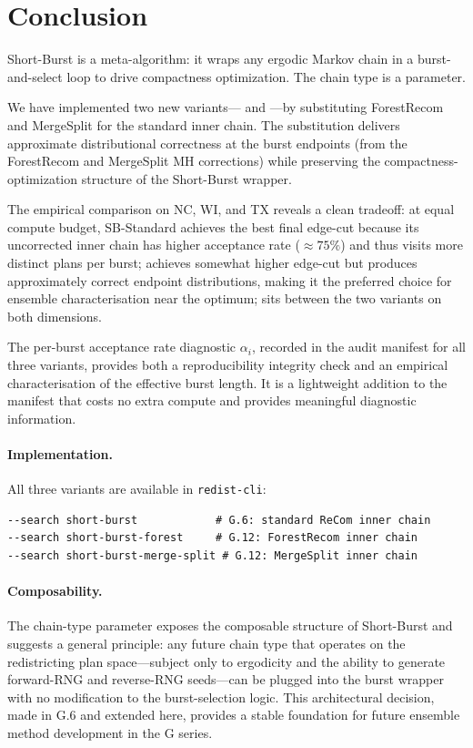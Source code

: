 \section{Conclusion}
\label{sec:conclusion}

Short-Burst is a meta-algorithm: it wraps any ergodic Markov chain in a
burst-and-select loop to drive compactness optimization.
The chain type is a parameter.

We have implemented two new variants---\sbf{} and \sbms{}---by substituting
ForestRecom and MergeSplit for the standard \recom{} inner chain.
The substitution delivers approximate distributional correctness at the
burst endpoints (from the ForestRecom and MergeSplit MH corrections) while
preserving the compactness-optimization structure of the Short-Burst wrapper.

The empirical comparison on NC, WI, and TX reveals a clean tradeoff:
at equal compute budget, SB-Standard achieves the best final edge-cut because
its uncorrected \recom{} inner chain has higher acceptance rate ($\approx 75\%$)
and thus visits more distinct plans per burst;
\sbf{} achieves somewhat higher edge-cut but produces approximately correct
endpoint distributions, making it the preferred choice for ensemble
characterisation near the optimum;
\sbms{} sits between the two variants on both dimensions.

The per-burst acceptance rate diagnostic $\alpha_i$, recorded in the audit
manifest for all three variants, provides both a reproducibility integrity
check and an empirical characterisation of the effective burst length.
It is a lightweight addition to the manifest that costs no extra compute
and provides meaningful diagnostic information.

\paragraph{Implementation.}
All three variants are available in \texttt{redist-cli}:
\begin{verbatim}
--search short-burst            # G.6: standard ReCom inner chain
--search short-burst-forest     # G.12: ForestRecom inner chain
--search short-burst-merge-split # G.12: MergeSplit inner chain
\end{verbatim}

\paragraph{Composability.}
The chain-type parameter exposes the composable structure of Short-Burst
and suggests a general principle: any future chain type that operates on
the redistricting plan space---subject only to ergodicity and the ability
to generate forward-RNG and reverse-RNG seeds---can be plugged into the
burst wrapper with no modification to the burst-selection logic.
This architectural decision, made in G.6 and extended here, provides a
stable foundation for future ensemble method development in the G series.
